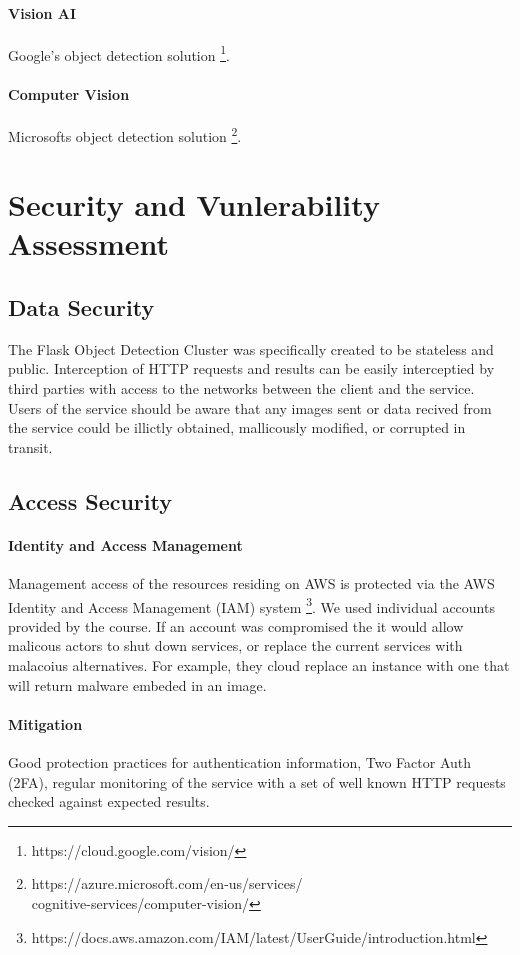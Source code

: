 \documentclass[conference]{IEEEtran}
\begin{document}
\paragraph{Vision AI}
Google's object detection solution \footnote{https://cloud.google.com/vision/}.
\paragraph{Computer Vision}
Microsofts object detection solution \footnote{https://azure.microsoft.com/en-us/services/\\cognitive-services/computer-vision/}.

\section{Security and Vunlerability Assessment}
\subsection{Data Security}
The Flask Object Detection Cluster was specifically created to be stateless and public. Interception of HTTP requests and results can be easily interceptied by third parties with access to the networks between the client and the service. Users of the service should be aware that any images sent or data recived from the service could be illictly obtained, mallicously modified, or corrupted in transit.
\subsection{Access Security}
\paragraph{Identity and Access Management}
Management access of the resources residing on AWS is protected via the AWS Identity and Access Management (IAM) system \footnote{https://docs.aws.amazon.com/IAM/latest/UserGuide/introduction.html}. We used individual accounts provided by the course. If an account was compromised the it would allow malicous actors to shut down services, or replace the current services with malacoius alternatives. For example, they cloud replace an instance with one that will return malware embeded in an image.
\paragraph{Mitigation}
Good protection practices for authentication information, Two Factor Auth (2FA), regular monitoring of the service with a set of well known HTTP requests checked against expected results.
\end{document}
